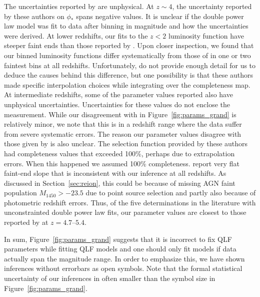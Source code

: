 \documentclass[fleqn,usenatbib]{mnras}
\newcommand{\new}[1]{{\color{notecolor} #1}}
\begin{document}
\new{The uncertainties reported by \citet{2012ApJ...755..169M} are
  unphysical.  At $z\sim 4$, the uncertainty reported by these authors
  on $\phi_*$ spans negative values.  It is unclear if the double
  power law model was fit to data after binning in magnitude and how
  the uncertainties were derived.  At lower redshifts, our fits to the
  $z<2$ luminosity function have steeper faint ends than those
  reported by \citet{2009MNRAS.399.1755C}.  Upon closer inspection, we
  found that our binned luminosity functions differ systematically
  from those of \citet{2009MNRAS.399.1755C} in one or two faintest
  bins at all redshifts.  Unfortunately, \citet{2009MNRAS.399.1755C}
  do not provide enough detail for us to deduce the causes behind this
  difference, but one possibility is that these authors made specific
  interpolation choices while integrating over the completeness map.
  At intermediate redshifts, some of the parameter values reported
  \citet{2013ApJ...773...14R} also have unphysical uncertainties.
  Uncertainties for these values do not enclose the measurement.
  While our disagreement with \citet{2013ApJ...773...14R} in
  Figure~\ref{fig:params_grand} is relatively minor, we note that this
  is in a redshift range where the data suffer from severe systematic
  errors.  The reason our parameter values disagree with those given
  by \citet{2011ApJ...728L..26G} is also unclear.  The selection
  function provided by these authors had completeness values that
  exceeded 100\%, perhaps due to extrapolation errors.  When this
  happened we assumed 100\% completeness.  \citet{2018PASJ...70S..34A}
  report very flat faint-end slope that is inconsistent with our
  inference at all redshifts.  As discussed in
  Section~\ref{sec:reion}, this could be because of missing AGN faint
  population $M_{1450} > -23.5$ due to point source selection and
  partly also because of photometric redshift errors.  Thus, of the
  five determinations in the literature with unconstrainted double
  power law fits,} our parameter values are closest to those reported
by \citet{2016ApJ...829...33Y} at $z=4.7$--$5.4$.

\new{In sum, Figure~\ref{fig:params_grand} suggests that it is
  incorrect to fix QLF parameters while fitting QLF models and one
  should only fit models if data actually span the magnitude range.
  In order to emphasize this, we have shown inferences without
  errorbars as open symbols.  Note that the formal statistical
  uncertainty of our inferences in often smaller than the symbol size
  in Figure~\ref{fig:params_grand}.}
\end{document}
